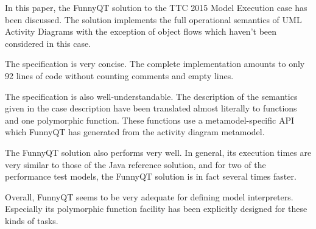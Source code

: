 \documentclass[submission]{eptcs}
\begin{document}
In this paper, the FunnyQT solution to the TTC 2015 Model Execution case has
been discussed.  The solution implements the full operational semantics of UML
Activity Diagrams with the exception of object flows which haven't been
considered in this case.

The specification is very concise.  The complete implementation amounts to only
92 lines of code without counting comments and empty lines.

The specification is also well-understandable.  The description of the
semantics given in the case description have been translated almost literally
to functions and one polymorphic function.  These functions use a
metamodel-specific API which FunnyQT has generated from the activity diagram
metamodel.

The FunnyQT solution also performs very well.  In general, its execution times
are very similar to those of the Java reference solution, and for two of the
performance test models, the FunnyQT solution is in fact several times faster.

Overall, FunnyQT seems to be very adequate for defining model interpreters.
Especially its polymorphic function facility has been explicitly designed for
these kinds of tasks.



\end{document}
